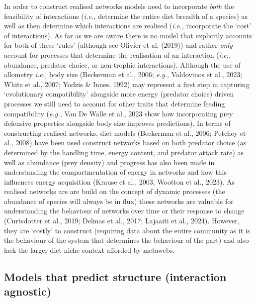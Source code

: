 \documentclass[
]{article}
\begin{document}
In order to construct realised networks models need to incorporate
\emph{both} the feasibility of interactions (\emph{i.e.,} determine the
entire diet breadth of a species) as well as then determine which
interactions are realised (\emph{i.e.,} incorporate the `cost' of
interactions). As far as we are aware there is no model that explicitly
accounts for both of these `rules' (although see Olivier et al. (2019))
and rather \emph{only} account for processes that determine the
realisation of an interaction (\emph{i.e.,} abundance, predator choice,
or non-trophic interactions). Although the use of allometry \emph{i.e.,}
body size (Beckerman et al., 2006; \emph{e.g.,} Valdovinos et al., 2023;
White et al., 2007; Yodzis \& Innes, 1992) may represent a first step in
capturing `evolutionary compatibility' alongside more energy (predator
choice) driven processes we still need to account for other traits that
determine feeding compatibility (\emph{e.g.,} Van De Walle et al., 2023
show how incorporating prey defensive properties alongside body size
improves predictions). In terms of constructing realised networks, diet
models (Beckerman et al., 2006; Petchey et al., 2008) have been used
construct networks based on both predator choice (as determined by the
handling time, energy content, and predator attack rate) as well as
abundance (prey density) and progress has also been made in
understanding the compartmentation of energy in networks and how this
influences energy acquisition (Krause et al., 2003; Wootton et al.,
2023). As realised networks are are build on the concept of dynamic
processes (the abundance of species will always be in flux) these
networks are valuable for understanding the behaviour of networks over
time or their response to change (Curtsdotter et al., 2019; Delmas et
al., 2017; Lajaaiti et al., 2024). However, they are `costly' to
construct (requiring data about the entire community as it is the
behaviour of the system that determines the behaviour of the part) and
also lack the larger diet niche context afforded by metawebs.

\subsection{Models that predict structure (interaction
agnostic)}\label{models-that-predict-structure-interaction-agnostic}
\end{document}
